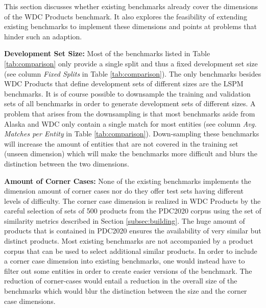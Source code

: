 \documentclass[sigconf,edbt]{acmart-edbt2024}
\begin{document}
This section discusses whether existing benchmarks already cover the dimensions of the WDC Products benchmark. It also explores the feasibility of extending existing benchmarks to implement these dimensions and points at  problems that hinder such an adaption.

\textbf{Development Set Size:} Most of the benchmarks listed in Table \ref{tab:comparison} only provide a single split and thus a fixed development set size (see column \textit{Fixed Splits} in Table \ref{tab:comparison}). The only benchmarks besides WDC Products that define development sets of different sizes are the LSPM benchmarks. It is of course possible to downsample the training and validation sets of all benchmarks in order to generate development sets of different sizes. A problem that arises from the downsampling is that most benchmarks aside from Alaska and WDC only contain a single match for most entities (see column \textit{Avg. Matches per Entity} in Table \ref{tab:comparison}). Down-sampling these benchmarks will increase the amount of entities that are not covered in the training set (unseen dimension) which will make the benchmarks more difficult and blurs the distinction between the two dimensions.

\textbf{Amount of Corner Cases:} None of the existing benchmarks implements the dimension amount of corner cases nor do they offer test sets having different levels of difficulty. The corner case dimension is realized in WDC Products by the careful selection of sets of 500 products from the PDC2020 corpus using the set of similarity metrics described in Section \ref{subsec:building}. 
The huge amount of products that is contained in PDC2020 ensures the availability of very similar but distinct products. Most existing benchmarks are not accompanied by a product corpus that can be used to select additional similar products. In order to include a corner case dimension into existing benchmarks, one would instead have to filter out some entities in order to create easier versions of the benchmark. The reduction of corner-cases would entail a reduction in the overall size of the benchmarks which would blur the distinction between the size and the corner case dimensions.
\end{document}
